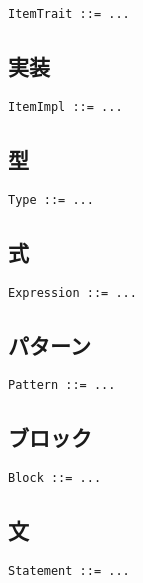 \documentclass[dvipdfmx,uplatex,papersize,a4paper,10pt]{jsbook}
\theoremstyle{definition}
\begin{document}
\begin{lstlisting}[language=BNFLike, gobble=2]
  ItemTrait ::= ...
\end{lstlisting}

\subsection{実装}

\begin{lstlisting}[language=BNFLike, gobble=2]
  ItemImpl ::= ...
\end{lstlisting}

\subsection{型}

\begin{lstlisting}[language=BNFLike, gobble=2]
  Type ::= ...
\end{lstlisting}

\subsection{式}

\begin{lstlisting}[language=BNFLike, gobble=2]
  Expression ::= ...
\end{lstlisting}

\subsection{パターン}

\begin{lstlisting}[language=BNFLike, gobble=2]
  Pattern ::= ...
\end{lstlisting}

\subsection{ブロック}

\begin{lstlisting}[language=BNFLike, gobble=2]
  Block ::= ...
\end{lstlisting}

\subsection{文}

\begin{lstlisting}[language=BNFLike, gobble=2]
  Statement ::= ...
\end{lstlisting}
\end{document}
